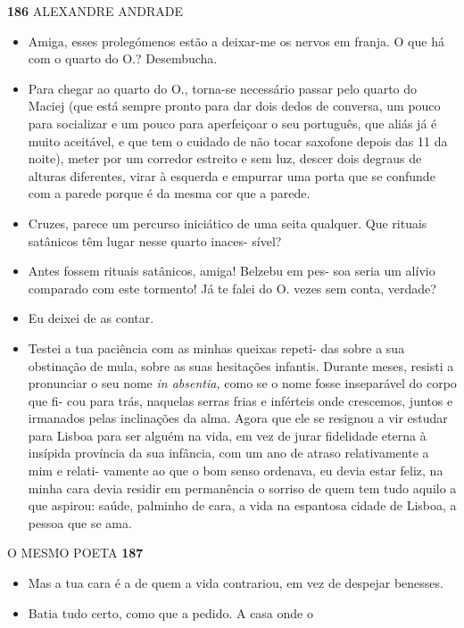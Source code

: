 \textbf{186 }ALEXANDRE ANDRADE

\begin{itemize}
\tightlist
\item
  Amiga, esses prolegómenos estão a deixar-me os nervos em franja. O que
  há com o quarto do O.? Desembucha.
\item
  Para chegar ao quarto do O., torna-se necessário passar pelo quarto do
  Maciej (que está sempre pronto para dar dois dedos de conversa, um
  pouco para socializar e um pouco para aperfeiçoar o seu português, que
  aliás já é muito aceitável, e que tem o cuidado de não tocar saxofone
  depois das 11 da noite), meter por um corredor estreito e sem luz,
  descer dois degraus de alturas diferentes, virar à esquerda e empurrar
  uma porta que se confunde com a parede porque é da mesma cor que a
  parede.
\item
  Cruzes, parece um percurso iniciático de uma seita qualquer. Que
  rituais satânicos têm lugar nesse quarto inaces- sível?
\item
  Antes fossem rituais satânicos, amiga! Belzebu em pes- soa seria um
  alívio comparado com este tormento! Já te falei do O. vezes sem conta,
  verdade?
\item
  Eu deixei de as contar.
\item
  Testei a tua paciência com as minhas queixas repeti- das sobre a sua
  obstinação de mula, sobre as suas hesitações infantis. Durante meses,
  resisti a pronunciar o seu nome \emph{in absentia, }como se o nome
  fosse inseparável do corpo que fi- cou para trás, naquelas serras
  frias e inférteis onde crescemos, juntos e irmanados pelas inclinações
  da alma. Agora que ele se resignou a vir estudar para Lisboa para ser
  alguém na vida, em vez de jurar fidelidade eterna à insípida província
  da sua infância, com um ano de atraso relativamente a mim e relati-
  vamente ao que o bom senso ordenava, eu devia estar feliz, na minha
  cara devia residir em permanência o sorriso de quem tem tudo aquilo a
  que aspirou: saúde, palminho de cara, a vida na espantosa cidade de
  Lisboa, a pessoa que se ama.
\end{itemize}

O MESMO POETA \textbf{187}

\begin{itemize}
\tightlist
\item
  Mas a tua cara é a de quem a vida contrariou, em vez de despejar
  benesses.
\item
  Batia tudo certo, como que a pedido. A casa onde o
\end{itemize}

